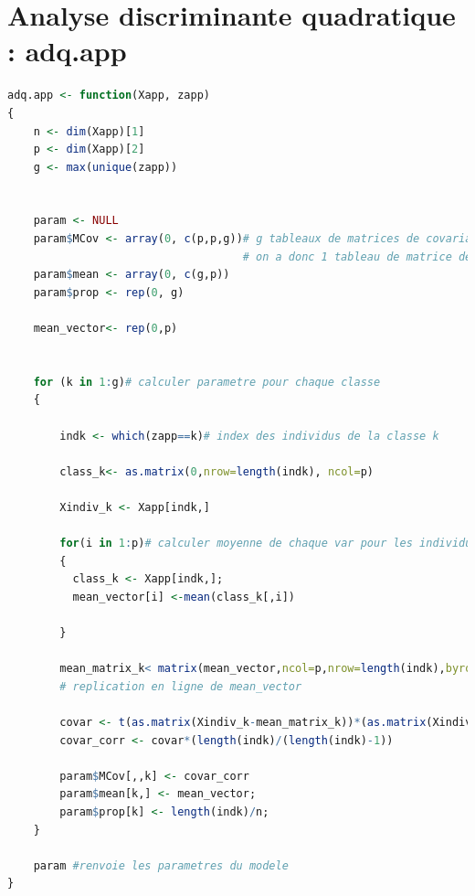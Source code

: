 \documentclass{article}
\begin{document}
\appendix

\section{Analyse discriminante quadratique : adq.app}
\label{adq.val}
\begin{lstlisting}[language=R]
adq.app <- function(Xapp, zapp)
{
	n <- dim(Xapp)[1]
	p <- dim(Xapp)[2]
	g <- max(unique(zapp))

	
	param <- NULL
	param$MCov <- array(0, c(p,p,g))# g tableaux de matrices de covariance de dim : p x p : 
	                                # on a donc 1 tableau de matrice de covariance par classe
	param$mean <- array(0, c(g,p))
	param$prop <- rep(0, g)

	mean_vector<- rep(0,p)

	
	for (k in 1:g)# calculer parametre pour chaque classe
	{
	 
		indk <- which(zapp==k)# index des individus de la classe k
		
		class_k<- as.matrix(0,nrow=length(indk), ncol=p)
		
		Xindiv_k <- Xapp[indk,]
		
		for(i in 1:p)# calculer moyenne de chaque var pour les individus de la classe k
		{
		  class_k <- Xapp[indk,];
		  mean_vector[i] <-mean(class_k[,i])
		  
		}

		mean_matrix_k< matrix(mean_vector,ncol=p,nrow=length(indk),byrow=TRUE) # matrice p*nombre d'individu de la classe k
		# replication en ligne de mean_vector
		
		covar <- t(as.matrix(Xindiv_k-mean_matrix_k))*(as.matrix(Xindiv_k-mean_matrix_k))/length(indk)
		covar_corr <- covar*(length(indk)/(length(indk)-1))
		
		param$MCov[,,k] <- covar_corr
		param$mean[k,] <- mean_vector;
		param$prop[k] <- length(indk)/n;
	}
    
	param #renvoie les parametres du modele
}
\end{lstlisting}
\end{document}
